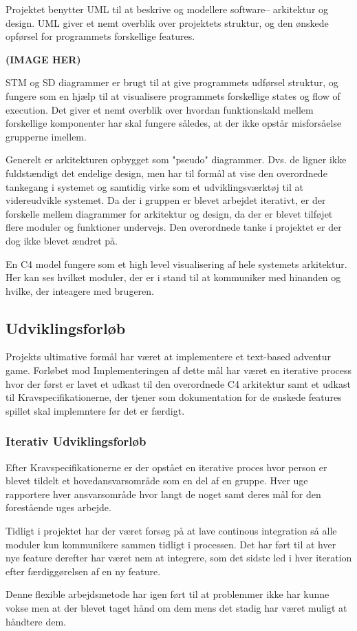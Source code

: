 Projektet benytter UML til at beskrive og modellere software-- arkitektur
og design. UML giver et nemt overblik over projektets struktur, og den 
ønskede opførsel for programmets forskellige features.

\textbf{(IMAGE HER)}

STM og SD diagrammer er brugt til at give programmets udførsel struktur, og fungere
som en hjælp til at visualisere programmets forskellige states og flow of execution.
Det giver et nemt overblik over hvordan funktionskald mellem forskellige komponenter
har skal fungere således, at der ikke opstår misforsåelse grupperne imellem. 

Generelt er arkitekturen opbygget som "pseudo" diagrammer. Dvs. de ligner ikke fuldstændigt 
det endelige design, men har til formål at vise den overordnede tankegang i systemet og 
samtidig virke som et udviklingsværktøj til at videreudvikle systemet. Da der i gruppen 
er blevet arbejdet iterativt, er der forskelle mellem diagrammer for arkitektur og design,
da der er blevet tilføjet flere moduler og funktioner undervejs. Den overordnede tanke i 
projektet er der dog ikke blevet ændret på.

En C4 model fungere som et high level visualisering af hele systemets arkitektur.
Her kan ses hvilket moduler, der er i stand til at kommuniker med hinanden og hvilke,
der inteagere med brugeren.

\subsection{Udviklingsforløb}
Projekts ultimative formål har været at implementere et text-based adventur game. 
Forløbet mod Implementeringen af dette mål har været en iterative process hvor 
der først er lavet et udkast til den overordnede C4 arkitektur samt et udkast
til Kravspecifikationerne, der tjener som dokumentation for de ønskede features 
spillet skal implemntere før det er færdigt.

\subsubsection{Iterativ Udviklingsforløb}

Efter Kravspecifikationerne er der opstået en iterative proces hvor person er
blevet tildelt et hovedansvarsområde som en del af en gruppe. Hver uge rapportere
hver ansvarsområde hvor langt de noget samt deres mål for den forestående uges arbejde.

Tidligt i projektet har der været forsøg på at lave continous integration så alle moduler
kun kommunikere sammen tidligt i processen. Det har ført til at hver nye feature derefter 
har været nem at integrere, som det sidste led i hver iteration efter færdiggørelsen af en
ny feature. 

Denne flexible arbejdsmetode har igen ført til at problemmer ikke har kunne vokse men
at der blevet taget hånd om dem mens det stadig har været muligt at håndtere dem.

